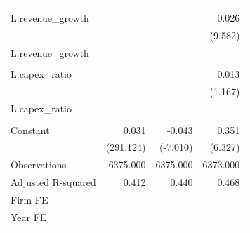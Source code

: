{\begin{tabular}{l*{3}{D{.}{.}{-1}}}
                &                  &                  &                  \\
L.revenue\_growth&                  &                  &    0.026\sym{***}\\
                &                  &                  &  (9.582)         \\
L.revenue\_growth&                  &                  &                  \\
                &                  &                  &                  \\
L.capex\_ratio   &                  &                  &    0.013         \\
                &                  &                  &  (1.167)         \\
L.capex\_ratio   &                  &                  &                  \\
                &                  &                  &                  \\
Constant        &    0.031\sym{***}&   -0.043\sym{***}&    0.351\sym{***}\\
                &(291.124)         & (-7.010)         &  (6.327)         \\
\midrule
Observations    & 6375.000         & 6375.000         & 6373.000         \\
Adjusted R-squared&    0.412         &    0.440         &    0.468         \\
Firm FE         &                  &                  &                  \\
Year FE         &                  &                  &                  \\
\bottomrule
\end{tabular}
}
